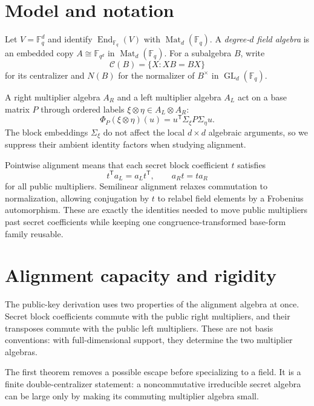 \documentclass[11pt]{article}
\newcommand{\F}{\mathbb F}
\newcommand{\Mat}{\operatorname{Mat}}
\newcommand{\transpose}{\mathsf T}
\begin{document}
\section{Model and notation}\label{sec:model}
Let $V=\F_q^d$ and identify $\operatorname{End}_{\F_q}(V)$ with
$\Mat_d(\F_q)$.  A \emph{degree-$d$ field algebra} is an embedded copy
$A\cong\F_{q^d}$ in $\Mat_d(\F_q)$.  For a subalgebra $B$, write
\[
 \mathcal C(B)=\{X:XB=BX\}
\]
for its centralizer and $N(B)$ for the normalizer of $B^\times$ in
$\operatorname{GL}_d(\F_q)$.

A right multiplier algebra $A_R$ and a left multiplier algebra $A_L$ act on a
base matrix $P$ through ordered labels $\xi\otimes\eta\in A_L\otimes A_R$:
\[
  \Phi_P(\xi\otimes\eta)(u)
    =u^\transpose\Sigma_\xi P\Sigma_\eta u.
\]
The block embeddings $\Sigma_\xi$ do not affect the local $d\times d$
algebraic arguments, so we suppress their ambient identity factors when
studying alignment.

Pointwise alignment means that each secret block coefficient $t$ satisfies
\[
 t^\transpose a_L=a_Lt^\transpose,
 \qquad
 a_Rt=ta_R
\]
for all public multipliers.  Semilinear alignment relaxes commutation to
normalization, allowing conjugation by $t$ to relabel field elements by a
Frobenius automorphism.  These are exactly the identities needed to move
public multipliers past secret coefficients while keeping one
congruence-transformed base-form family reusable.

\section{Alignment capacity and rigidity}\label{sec:alignment-rigidity}
\label{sec:alignment-forces-adjoint}

The public-key derivation uses two properties of the alignment algebra at
once.  Secret block coefficients commute with the public right multipliers,
and their transposes commute with the public left multipliers.  These are not
basis conventions: with full-dimensional support, they determine the two
multiplier algebras.

The first theorem removes a possible escape before specializing to a field.
It is a finite double-centralizer statement: a noncommutative irreducible
secret algebra can be large only by making its commuting multiplier algebra
small.
\end{document}
